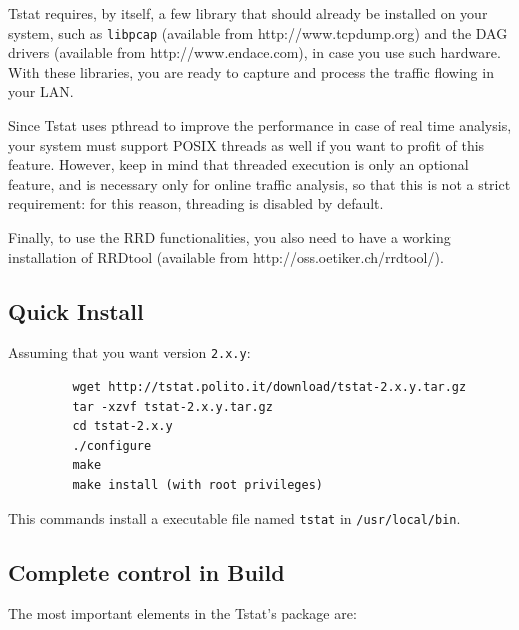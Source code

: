 \documentclass[11pt]{article}
\begin{document}
Tstat requires, by itself, a few library that should
already be installed on your system, such as 
\texttt{libpcap} (available from \textsf{http://www.tcpdump.org}) 
and the DAG drivers (available from \textsf{http://www.endace.com}), 
in case you use such hardware. With these libraries, 
you are ready to capture and process the traffic flowing
in your LAN.



Since Tstat uses pthread to improve the performance in case of real time
analysis, your system must support POSIX threads as well if you want to
profit of this feature. However, keep in mind that threaded execution 
is only an optional feature, and is necessary only for online traffic
analysis, so that this is not a strict requirement: for this reason,
threading is disabled by default.



Finally, to use the RRD functionalities, you also need to have a working
installation of RRDtool (available from \textsf{http://oss.oetiker.ch/rrdtool/}).

\subsection{Quick Install\label{Quick_Install}}


Assuming that you want version \texttt{2.x.y}:

\begin{small}\begin{verbatim}
         wget http://tstat.polito.it/download/tstat-2.x.y.tar.gz
         tar -xzvf tstat-2.x.y.tar.gz
         cd tstat-2.x.y
         ./configure
         make
         make install (with root privileges)
\end{verbatim}\end{small} \noindent
This commands install a executable file named \texttt{tstat} in \texttt{/usr/local/bin}.

\subsection{Complete control in Build\label{Complete_control_in_Build}}


The most important elements in the Tstat's package are:
\end{document}

